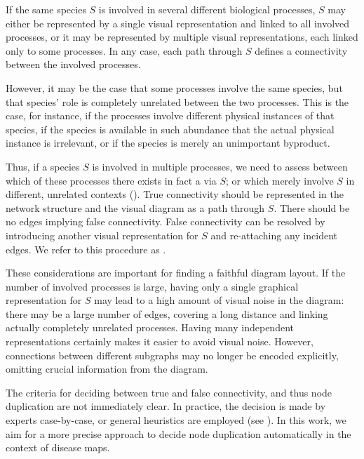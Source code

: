 \documentclass[
	fontsize=10pt, %
	twoside=true, %
	secnumdepth=1, %
  toc=indentunnumbered %
]{kaobook}
\begin{document}
If the same species $S$ is involved in several different biological processes,
$S$ may either be represented by a single visual representation and linked to
all involved processes, or it may be represented by multiple visual
representations, each linked only to some processes.
%
In any case, each path through $S$ defines a connectivity
between the involved processes.

However, it may be the case that some processes involve the same
species, but that species' role is completely unrelated between the two
processes. This is the case, for instance, if the processes involve different
physical instances of that species, if the species is available in such
abundance that the actual physical instance is irrelevant, or if the species is
merely an unimportant byproduct.

Thus, if a species $S$ is involved in multiple processes, we need to assess
between which of these processes there exists in fact a 
via $S$; or which merely involve $S$ in different, unrelated contexts
().
%
True connectivity should be represented in the network structure and the visual
diagram as a path through $S$. There should be no edges implying false
connectivity.
False connectivity can be resolved by introducing another visual representation
for $S$ and re-attaching any incident edges. We refer to this procedure as
.

These considerations are important for finding a faithful diagram layout.
If the number of involved processes is large, having only a single graphical
representation for $S$ may lead to a high amount of visual noise in the diagram: there
may be a large number of edges, covering a long distance and linking actually
completely unrelated processes.
%
Having many independent representations
certainly makes it easier to avoid visual noise. However, connections between
different subgraphs may no longer be encoded explicitly, omitting crucial
information from the diagram.

The criteria for deciding between true and false connectivity, and thus node
duplication are not immediately clear. In practice, the decision is made by
experts case-by-case, or general heuristics are employed (see
). In this work, we aim for a more precise approach to
decide node duplication automatically in the context of disease maps.
\end{document}
